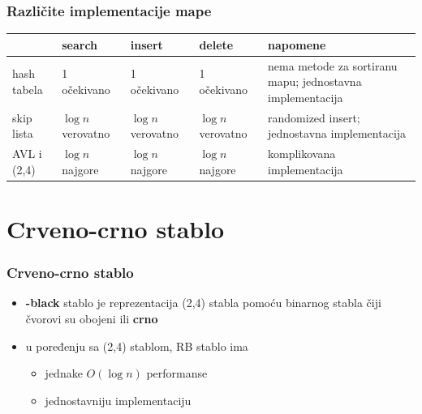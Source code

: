 \documentclass[compress,aspectratio=169]{beamer}
\begin{document}
\begin{frame}[fragile]
  \frametitle{Različite implementacije mape}
  \begin{tabular}{p{2cm}|p{1cm}|p{1cm}|p{1cm}|p{6cm}}
  & \textbf{search} & \textbf{insert} & \textbf{delete} & \textbf{napomene} \\ \hline\hline
  hash tabela & 1 \mbox{\tiny očekivano} & 1 \mbox{\tiny očekivano} & 1 \mbox{\tiny očekivano} & {\scriptsize nema metode za sortiranu mapu; jednostavna implementacija} \\ \hline
  skip lista & $\log n$ \mbox{\tiny verovatno} & $\log n$ \mbox{\tiny verovatno} & $\log n$ \mbox{\tiny verovatno} & {\scriptsize randomized insert; jednostavna implementacija} \\ \hline
  AVL i (2,4) & $\log n$ \mbox{\tiny najgore} & $\log n$ \mbox{\tiny najgore} & $\log n$ \mbox{\tiny najgore} & {\scriptsize komplikovana implementacija} \\ \hline
  \end{tabular}
\end{frame}

\section[RB stablo]{Crveno-crno stablo}

\begin{frame}[fragile]
  \frametitle{Crveno-crno stablo}
  \begin{itemize}
    \item \textbf{-black} stablo je reprezentacija (2,4) stabla pomoću binarnog stabla čiji čvorovi su obojeni \textbf{} ili \textbf{crno}
    \item u poređenju sa (2,4) stablom, RB stablo ima
    \begin{itemize}
      \item jednake $O(\log n)$ performanse
      \item jednostavniju implementaciju
    \end{itemize}
  \end{itemize}
\end{frame}
\end{document}
